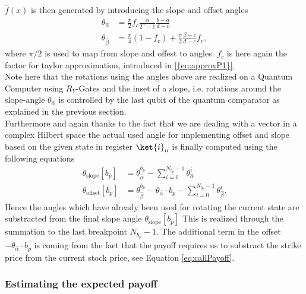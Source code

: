 \documentclass[../../main.tex]{subfiles}
\begin{document}
$\hat{f}(x)$ is then generated by introducing the slope and offset angles
\begin{align}\label{eq:affineAngles}
  \theta_{\hat{\alpha}} &= \frac{\pi}{2}f_c\frac{\alpha}{2^n-1}\frac{b-a}{d-c}\\
  \theta_{\hat{\beta}} &=\frac{\pi}{4}(1-f_c) + \frac{\pi}{2}\frac{\beta-c}{d-c}f_c,
\end{align}
where $\pi/2$ is used to map from slope and offest to angles. $f_c$ is here again the factor for taylor approximation, introduced in \ref{{eq:approxP1}}.\\
Note here that the rotations using the angles above are realized on a Quantum Computer using $R_Y$-Gates
and the inset of a slope, i.e. rotations around the slope-angle $\theta_{\hat{\alpha}}$ is controlled by the last qubit of the quantum comparator
as explained in the previous section.\\
Furthermore and again thanks to the fact that we are dealing with a vector in a complex Hilbert space the actual used angle for implementing offset and slope
based on the given state in register $\ket{i}_n$ is finally computed using the following equations
\begin{align}
\theta_{\text{slope}}[b_p] &= \theta_{\hat{\alpha}}^{b_p} - \sum_{i=0}^{N_{b_p} - 1}\theta_{\hat{\alpha}}^{i} \label{eq:finalAngle} \\
\theta_{\text{offset}}[b_p] &= \theta_{\hat{\beta}}^{b_p} - \theta_{\hat{\alpha}} \cdot b_p - \sum_{i=0}^{N_{b_p} - 1}\theta_{\hat{\beta}}^{i} \label{eq:finalOffest}.
\end{align}
Hence the angles which have already been used for rotating the current state are substracted from the final slope angle $\theta_{\text{slope}}[b_p]$
This is realized through the summation to the last breakpoint $N_{b_p} - 1$. The additional term in the offset $ - \theta_{\hat{\alpha}} \cdot b_p$ is coming from the fact that the payoff
requires us to substract the strike price from the current stock price, see Equation \ref{eq:callPayoff}.\\

\subsubsection{Estimating the expected payoff}
\biblio
\end{document}
